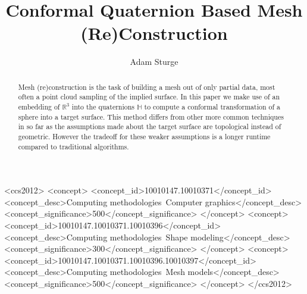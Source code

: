 \documentclass[sigconf]{acmart}
\begin{document}
\title{Conformal Quaternion Based Mesh (Re)Construction}

\author{Adam Sturge}


\renewcommand{\shortauthors}{A. Sturge}

\begin{abstract}

Mesh (re)construction is the task of building a mesh out of only partial data, most often a point cloud sampling of the implied surface. In this paper we make use of an embedding of $\mathbb{R}^3$ into the quaternions $\mathbb{H}$ to compute  a conformal transformation of a sphere into a target surface. This method differs from other more common techniques in so far as the assumptions made about the target surface are topological instead of geometric. However the tradeoff for these weaker assumptions is a longer runtime compared to traditional algorithms. 

\end{abstract}

\begin{CCSXML}
<ccs2012>
<concept>
<concept_id>10010147.10010371</concept_id>
<concept_desc>Computing methodologies~Computer graphics</concept_desc>
<concept_significance>500</concept_significance>
</concept>
<concept>
<concept_id>10010147.10010371.10010396</concept_id>
<concept_desc>Computing methodologies~Shape modeling</concept_desc>
<concept_significance>300</concept_significance>
</concept>
<concept>
<concept_id>10010147.10010371.10010396.10010397</concept_id>
<concept_desc>Computing methodologies~Mesh models</concept_desc>
<concept_significance>500</concept_significance>
</concept>
</ccs2012>
\end{CCSXML}


\end{document}
